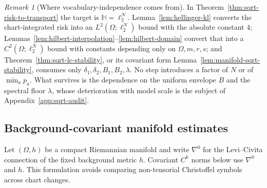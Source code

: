 \documentclass[11pt]{article}
\theoremstyle{definition}
\theoremstyle{remark}
\newtheorem{remark}[theorem]{Remark}
\begin{document}
\begin{remark}[Where vocabulary-independence comes from]\label{rem:where-N-free}
In Theorem~\ref{thm:sqrt-risk-to-transport} the target is
$\mathbb H=\ell_2^N$.
Lemma~\ref{lem:hellinger-kl} converts the chart-integrated risk into an
$L^2(\Omega;\ell_2^N)$ bound with the absolute constant $4$;
Lemmas~\ref{lem:hilbert-interpolation}--\ref{lem:hilbert-domain} convert that
into a $C^2(\Omega;\ell_2^N)$ bound with constants depending only on
$\Omega,m,r,s$; and Theorem~\ref{thm:sqrt-lc-stability}, or its covariant form
Lemma~\ref{lem:manifold-sqrt-stability}, consumes only
$\delta_1,\delta_2,B_1,B_2,\lambda$. No step introduces a factor of $N$ or of
$\min_ap_a$. What survives is the dependence on the uniform envelope $B$ and
the spectral floor $\lambda$, whose deterioration with model scale is the
subject of Appendix~\ref{app:sqrt-audit}.
\end{remark}

\subsection{Background-covariant manifold estimates}

Let $(\Omega,h)$ be a compact Riemannian manifold and write $\nabla^0$ for the
Levi--Civita connection of the fixed background metric $h$. Covariant $C^k$
norms below use $\nabla^0$ and $h$. This formulation avoids comparing
non-tensorial Christoffel symbols across chart changes.
\end{document}
